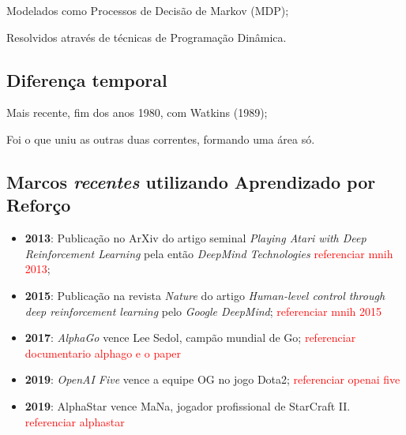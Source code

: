 \documentclass{article}
\begin{document}
            Modelados como Processos de Decisão de Markov (MDP);
            
            Resolvidos através de técnicas de Programação Dinâmica.
    
        
        \subsection{Diferença temporal}
            Mais recente, fim dos anos 1980, com Watkins     (1989);
            
            Foi o que uniu as outras duas correntes, formando uma área só.
            
        \subsection{Marcos \emph{recentes} utilizando Aprendizado por Reforço}
        
            \begin{itemize}
                \item \textbf{2013}: Publicação no ArXiv do artigo seminal \emph{Playing Atari with Deep Reinforcement Learning} pela então \emph{DeepMind Technologies} \textcolor{red}{referenciar mnih 2013};
                \item \textbf{2015}: Publicação na revista \emph{Nature} do artigo \emph{Human-level control through deep reinforcement learning} pelo \emph{Google DeepMind}; \textcolor{red}{referenciar mnih 2015}
                \item \textbf{2017}: \emph{AlphaGo} vence Lee Sedol, campão mundial de Go;  \textcolor{red}{referenciar documentario alphago e o paper}
                \item \textbf{2019}: \emph{OpenAI Five} vence a equipe OG no jogo Dota2;  \textcolor{red}{referenciar openai five}
                \item \textbf{2019}: AlphaStar vence MaNa, jogador profissional de StarCraft II. \textcolor{red}{referenciar alphastar}
            \end{itemize}

    
\end{document}
